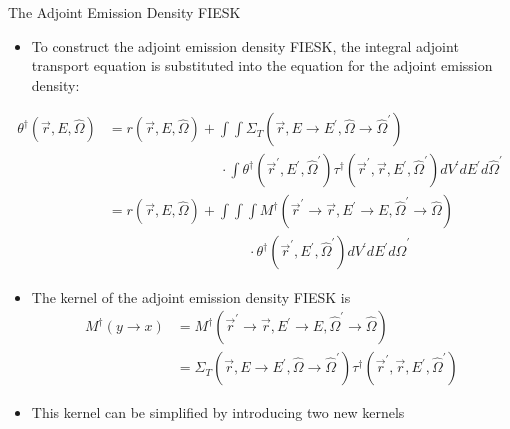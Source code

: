 \documentclass{beamer}
\begin{document}
\begin{frame}{The Adjoint Emission Density FIESK}

  \begin{itemize}
    \item To construct the adjoint emission density FIESK, the integral 
      adjoint transport equation is substituted into the equation for
      the adjoint emission density:
  \end{itemize}
  \begin{align}
    \theta^{\dagger}(\vec{r},E,\hat{\Omega}) & = r(\vec{r},E,\hat{\Omega}) +
    \int\int \Sigma_T(\vec{r},E \to E^{'},\hat{\Omega} \to \hat{\Omega}^{'})
    \nonumber \\
    & \qquad \qquad \qquad \qquad \cdot
    \int \theta^{\dagger}(\vec{r}^{'},E^{'},\hat{\Omega}^{'}) 
    \tau^{\dagger}(\vec{r}^{'},\vec{r},E^{'},\hat{\Omega}^{'}) 
    dV^{'} dE^{'} d\hat{\Omega}^{'} \nonumber \\
    & = r(\vec{r},E,\hat{\Omega}) +
    \int\int\int M^{\dagger}(\vec{r}^{'} \to \vec{r},E^{'} \to E,
        \hat{\Omega}^{'} \to \hat{\Omega}) \nonumber \\
         & \qquad \qquad \qquad \qquad \qquad \cdot
         \theta^{\dagger}(\vec{r}^{'},E^{'},\hat{\Omega}^{'}) 
         dV^{'} dE^{'} d\hat{\Omega}^{'} \nonumber
  \end{align}

  \begin{itemize}
    \item The kernel of the adjoint emission density FIESK is
      \begin{align}
        M^{\dagger}(y \to x) & = M^{\dagger}(\vec{r}^{'} \to \vec{r},E^{'} \to E,
        \hat{\Omega}^{'} \to \hat{\Omega}) \nonumber \\
        & = \Sigma_T(\vec{r},E \to E^{'},\hat{\Omega} \to \hat{\Omega}^{'})
        \tau^{\dagger}(\vec{r}^{'},\vec{r},E^{'},\hat{\Omega}^{'}) \nonumber
      \end{align}
    \item This kernel can be simplified by introducing two new kernels
  \end{itemize}

\end{frame}
\end{document}
